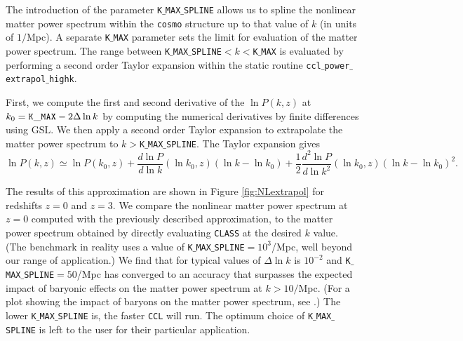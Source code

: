 \documentclass[\docopts]{\docclass}
\begin{document}
The introduction of the parameter {\tt K$\_$MAX$\_$SPLINE} allows us to spline the nonlinear matter power spectrum within the {\tt cosmo} structure up to that value of $k$ (in units of $1/$Mpc). A separate {\tt K$\_$MAX} parameter sets the limit for evaluation of the matter power spectrum. The range between {\tt K$\_$MAX$\_$SPLINE}$<k<${\tt K$\_$MAX} is evaluated by performing a second order Taylor expansion within the static routine {\tt ccl$\_$power$\_$extrapol$\_$highk}.

First, we compute the first and second derivative of the $\ln P(k,z)$ at $k_0={\rm \tt K\_MAX}-2\Delta\ln k$ by computing the numerical derivatives by finite differences using GSL. We then apply a second order Taylor expansion to extrapolate the matter power spectrum to $k>${\tt K$\_$MAX$\_$SPLINE}. The Taylor expansion gives
%
\begin{equation}
  \ln P(k,z) \simeq \ln P(k_0,z) + \frac{d\ln P}{d\ln k}(\ln k_0,z) (\ln k-\ln k_0)  + \frac{1}{2}  \frac{d^2\ln P}{d\ln k^2}(\ln k_0,z) (\ln k-\ln k_0)^2.
  \label{eq:NLPSTaylor}
\end{equation}

The results of this approximation are shown in Figure \ref{fig:NLextrapol} for redshifts $z=0$ and $z=3$. We compare the nonlinear matter power spectrum at $z=0$ computed with the previously described approximation, to the matter power spectrum obtained by directly evaluating {\tt CLASS} at the desired $k$ value. (The benchmark in reality uses a value of {\tt K$\_$MAX$\_$SPLINE}$=10^3$/Mpc, well beyond our range of application.) We find that for typical values of  $\Delta \ln k$ is $10^{-2}$ and {\tt K$\_$MAX$\_$SPLINE}$=50$/Mpc has converged to an accuracy that surpasses the expected impact of baryonic effects on the matter power spectrum at $k>10/$Mpc. (For a plot showing the impact of baryons on the matter power spectrum, see \citealt{Schneider15}.) The lower {\tt K$\_$MAX$\_$SPLINE} is, the faster {\tt CCL} will run. The optimum choice of {\tt K$\_$MAX$\_$SPLINE} is left to the user for their particular application. 
\end{document}
